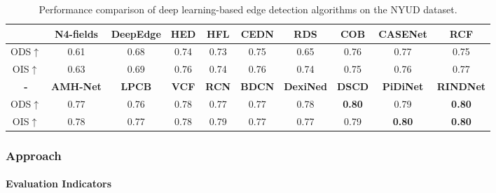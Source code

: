 \documentclass[a4paper, 10pt]{article}
\begin{document}
			\begin{table}[!htbp]
				\centering
				\tiny
					\begin{tabular}{c|c|c|c|c|c|c|c|c|c}
						
						\hline
						
						\textbf{} & \textbf{N4-fields} & \textbf{DeepEdge} & \textbf{HED} & \textbf{HFL} & \textbf{CEDN} &  \textbf{RDS} & \textbf{COB} & \textbf{CASENet} & \textbf{RCF} \\
						
						\hline
						
						ODS$\uparrow$ & 0.61 & 0.68 & 0.74 & 0.73 & 0.75 & 0.65 & 0.76 & 0.77 & 0.75 \\
						
						OIS$\uparrow$ & 0.63 & 0.69 & 0.76 & 0.74 & 0.76 & 0.74 & 0.75 & 0.76 & 0.77 \\
						
						\hline
						
						\textbf{-} & \textbf{AMH-Net} & \textbf{LPCB} & \textbf{VCF} & \textbf{RCN} & \textbf{BDCN} &  \textbf{DexiNed} & \textbf{DSCD} & \textbf{PiDiNet} & \textbf{RINDNet} \\
						
						\hline
						
						ODS$\uparrow$ & 0.77 & 0.76 & 0.78 & 0.77 & 0.77 & 0.78 & \textbf{0.80} & 0.79 & \textbf{0.80} \\
						
						OIS$\uparrow$ & 0.78 & 0.77 & 0.78 & 0.79 & 0.77 & 0.77 & 0.79 & \textbf{0.80} & \textbf{0.80} \\
						
						\hline
						
					\end{tabular}
				\captionsetup{font=scriptsize} 
				\caption{\label{tab: Deep learning on the NYUD dataset}
					Performance comparison of deep learning-based edge detection algorithms on the NYUD dataset.} 
			\end{table}
			
			\subsubsection{Approach}
			
			\paragraph{Evaluation Indicators}
			
\end{document}
